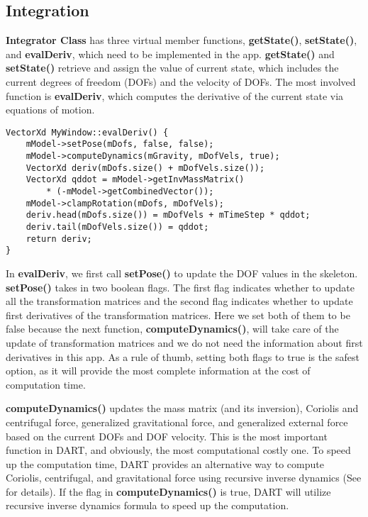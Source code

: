 \subsection{Integration}
\textbf{Integrator Class} has three virtual member functions,
\textbf{getState()}, \textbf{setState()}, and \textbf{evalDeriv},
which need to be implemented in the app. \textbf{getState()} and
\textbf{setState()} retrieve and assign the value of current state,
which includes the current degrees of freedom (DOFs) and the velocity
of DOFs. The most involved function is \textbf{evalDeriv}, which
computes the derivative of the current state via equations of motion.

\ttfamily
\begin{lstlisting}[label=evalDeriv,caption=evalDeriv]
VectorXd MyWindow::evalDeriv() {
    mModel->setPose(mDofs, false, false);
    mModel->computeDynamics(mGravity, mDofVels, true);
    VectorXd deriv(mDofs.size() + mDofVels.size());
    VectorXd qddot = mModel->getInvMassMatrix() 
        * (-mModel->getCombinedVector());
    mModel->clampRotation(mDofs, mDofVels);
    deriv.head(mDofs.size()) = mDofVels + mTimeStep * qddot;
    deriv.tail(mDofVels.size()) = qddot;
    return deriv;
}
\end{lstlisting}
\rmfamily
In \textbf{evalDeriv}, we first call \textbf{setPose()} to update the
DOF values in the skeleton. \textbf{setPose()} takes in two boolean
flags. The first flag indicates whether to update all the
transformation matrices and the second flag indicates whether to
update first derivatives of the transformation matrices. Here we set
both of them to be false because the next function, 
\textbf{computeDynamics()}, will take care of the update of
transformation matrices and we do not need the information about first
derivatives in this app. As a rule of thumb, setting both flags to
true is the safest option, as it will provide the most complete
information at the cost of computation time.

\textbf{computeDynamics()} updates the mass matrix (and its
inversion), Coriolis and centrifugal force, generalized gravitational force,
and generalized external force based on the current DOFs and DOF
velocity. This is the most important function in DART, and obviously,
the most computational costly one. To speed up the computation time,
DART provides an alternative way to compute Coriolis, centrifugal, and
gravitational force using recursive inverse dynamics (See
\cite{dynamics-tutorial} for details). If the flag in
\textbf{computeDynamics()} is true, DART will utilize recursive
inverse dynamics formula to speed up the computation.

